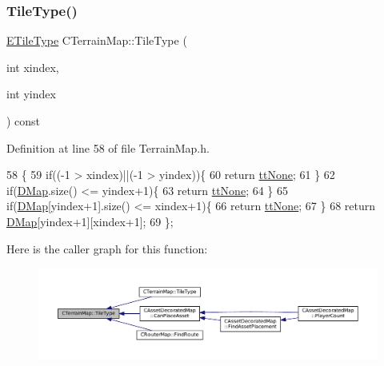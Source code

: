 \subsubsection{\texorpdfstring{Tile\+Type()}{TileType()}\hspace{0.1cm}{\footnotesize\ttfamily [1/2]}}
{\footnotesize\ttfamily \hyperlink{classCTerrainMap_aff2ab991e237269941416dd79d8871d4}{E\+Tile\+Type} C\+Terrain\+Map\+::\+Tile\+Type (\begin{DoxyParamCaption}\item[{int}]{xindex,  }\item[{int}]{yindex }\end{DoxyParamCaption}) const\hspace{0.3cm}{\ttfamily [inline]}}



Definition at line 58 of file Terrain\+Map.\+h.


\begin{DoxyCode}
58                                                         \{
59             \textcolor{keywordflow}{if}((-1 > xindex)||(-1 > yindex))\{
60                 \textcolor{keywordflow}{return} \hyperlink{classCTerrainMap_aff2ab991e237269941416dd79d8871d4a481e779132fb16414d17870bd6229eb5}{ttNone};    
61             \}
62             \textcolor{keywordflow}{if}(\hyperlink{classCTerrainMap_a80d154ce478948b10473534a7bca13f6}{DMap}.size() <= yindex+1)\{
63                 \textcolor{keywordflow}{return} \hyperlink{classCTerrainMap_aff2ab991e237269941416dd79d8871d4a481e779132fb16414d17870bd6229eb5}{ttNone};   
64             \}
65             \textcolor{keywordflow}{if}(\hyperlink{classCTerrainMap_a80d154ce478948b10473534a7bca13f6}{DMap}[yindex+1].size() <= xindex+1)\{
66                 \textcolor{keywordflow}{return} \hyperlink{classCTerrainMap_aff2ab991e237269941416dd79d8871d4a481e779132fb16414d17870bd6229eb5}{ttNone};   
67             \}
68             \textcolor{keywordflow}{return} \hyperlink{classCTerrainMap_a80d154ce478948b10473534a7bca13f6}{DMap}[yindex+1][xindex+1];
69         \};
\end{DoxyCode}
Here is the caller graph for this function\+:
\nopagebreak
\begin{figure}[H]
\begin{center}
\leavevmode
\includegraphics[width=350pt]{classCTerrainMap_a7e0e440467a09cb1c59e2bdbec01ccb4_icgraph}
\end{center}
\end{figure}
\hypertarget{classCTerrainMap_a3a7229412b3391835dd6036439e5c6c0}{}\label{classCTerrainMap_a3a7229412b3391835dd6036439e5c6c0} 
